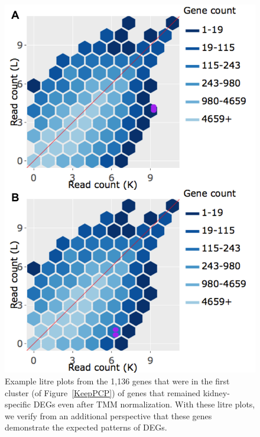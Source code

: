 \documentclass{article}
\begin{document}
\null
\begin{figure}[t!]
\centerline{\includegraphics[width=0.7\columnwidth]{../Dashboards/exampleKeep.png}}
\caption{Example litre plots from the 1,136 genes that were in the first cluster (of Figure~\ref{KeepPCP}) of genes that remained kidney-specific DEGs even after TMM normalization. With these litre plots, we verify from an additional perspective that these genes demonstrate the expected patterns of DEGs.
\label{KeepLitre}}
\end{figure}
\end{document}
